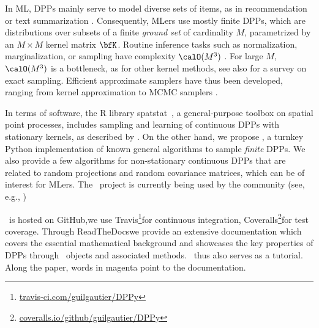 \documentclass[twoside,11pt]{article}
\begin{document}
    In ML, DPPs mainly serve to model diverse sets of items, as in recommendation \citep{KaDeKo16, GaPaKo16} or text summarization \citep{DuBa18}.
    Consequently, MLers  use mostly finite DPPs, which are distributions over subsets of a finite \emph{ground set} of cardinality $M$, parametrized by an $M\times M$ kernel matrix $\bfK$.
    Routine inference tasks such as normalization, marginalization, or sampling have complexity $\calO(M^3)$ \citep{Gil14}.
    For large $M$, $\calO(M^3)$ is a bottleneck, as for other kernel methods, see also \citet{TrBaAm18} for a survey on exact sampling.
    Efficient approximate samplers have thus been developed, ranging from kernel approximation \citep{AKFT13} to MCMC samplers \citep{AnGhRe16, LiJeSr16c, GaBaVa17}.

    In terms of software, the R library \textsf{spatstat}\ \citep{BaTu05}, a general-purpose toolbox on spatial point processes, includes sampling and learning of continuous DPPs with stationary kernels, as described by \citet{LaMoRu15}.
    On the other hand, we propose \DPPy, a turnkey Python implementation of known general algorithms to sample \emph{finite} DPPs.
    We also provide a few algorithms for non-stationary continuous DPPs that are related to random projections and random covariance matrices, which can be of interest for MLers.
    The \DPPy\ project is currently being used by the community (see, e.g., \citealp{BuRaWi19,Kam18,Pou19,DeCaVa19,GaBaVa19})
    \setcounter{footnote}{3}

    \DPPy\ is hosted on GitHub,\!we use \setcounter{footnote}{5}Travis\!\footnote{\href{https://travis-ci.com/guilgautier/DPPy}{\textsf{travis-ci.com/guilgautier/DPPy}}}for continuous integration, Coveralls\!\footnote{\href{https://coveralls.io/github/guilgautier/DPPy}{\textsf{coveralls.io/github/guilgautier/DPPy}}}for test coverage.
    Through ReadTheDocs\hspace{1pt}we provide an extensive documentation which covers the essential mathematical background and showcases the key properties of DPPs through \DPPy\ objects and associated methods.
    \DPPy\ thus also serves as a tutorial.
     Along the paper, words in magenta point to the documentation.


\end{document}
